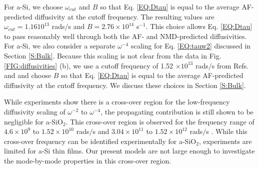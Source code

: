\documentclass[aps,prb,onecolumn,preprint,superscriptaddress,footinbib,amsmath,amssymb,floatfix]{revtex4}
\begin{document}
For a-Si, we choose $\omega_{cut}$  
and $B$ so that Eq. \eqref{EQ:Dtau} is equal 
to the average AF-predicted diffusivity at the cutoff frequency. 
The resulting values are $\omega_{cut}=1.16 10^{13}$ rads$/$s 
and $B=2.76\times10^{14}$ s$^{-1}$. This choice 
allows Eq. \eqref{EQ:Dtau} to pass reasonably well through both 
the AF- and NMD-predicted diffusivities. For a-Si, we also 
consider a separate $\omega^{-4}$ scaling 
for Eq. \eqref{EQ:tauw2} discussed in Section \ref{S:Bulk}. 
Because this scaling is not clear from the data in 
Fig. \ref{FIG:diffusivities} (b),  
we use a cutoff frequency of 1.52 $\times 10^{13}$ rads$/$s  
from Refs.  and 
and choose $B$ so that Eq. \eqref{EQ:Dtau} is equal to the average 
AF-predicted diffusivity at the cutoff frequency. 
We discuss these choices in Section \ref{S:Bulk}. 

While experiments show there is a cross-over region for the 
low-frequency diffusivity scaling of $\omega^{-2}$ to 
$\omega^{-4}$,
\cite{masciovecchio_evidence_2006,baldi_emergence_2013} 
the propagating contribution is still shown to be negligible 
for a-SiO$_2$.
\cite{love_estimate_1990,baldi_thermal_2008}
This cross-over region is observed for the frequency range of 
$4.6\times10^9$ to 
$1.52\times10^{10}$ rads$/$s\cite{masciovecchio_evidence_2006} 
and $3.04\times10^11$ to $1.52\times10^{12}$ rads$/$s
\cite{baldi_emergence_2013}. While this cross-over frequency 
can be identified 
experimentally for a-SiO$_2$,\cite{masciovecchio_evidence_2006} 
experiments are limited for a-Si thin films.
\cite{hondongwa_ultrasonic_2011} 
Our present models are not 
large enough to investigate the mode-by-mode properties 
in this cross-over region.
\end{document}
